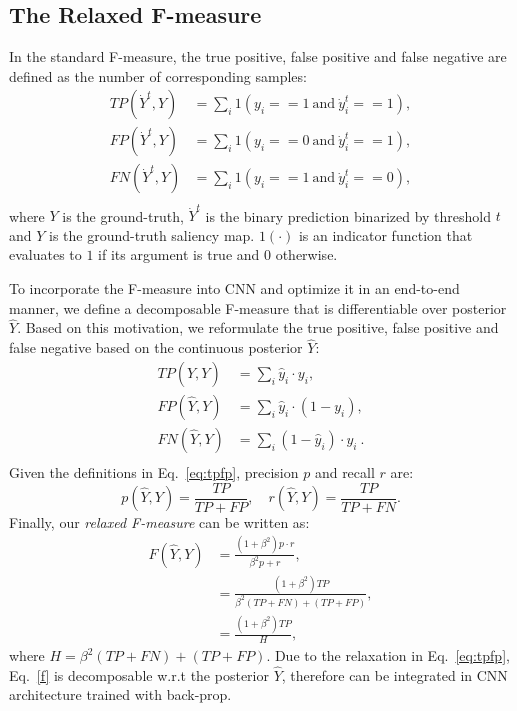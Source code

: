 \documentclass[10pt,twocolumn,letterpaper]{article}
\begin{document}
\subsection{The Relaxed F-measure}
In the standard F-measure, the true positive, 
false positive and false negative are defined as the number of corresponding samples:
\begin{equation}
\begin{split}
TP(\dot{Y}^t, Y) &= \sum\nolimits_i 1(y_i==1 \ \text{and} \ \dot{y}^t_i==1), \\
FP(\dot{Y}^t, Y) &= \sum\nolimits_i 1(y_i==0 \ \text{and} \ \dot{y}^t_i==1), \\
FN(\dot{Y}^t, Y) &= \sum\nolimits_i 1(y_i==1 \ \text{and} \ \dot{y}^t_i==0), \\
\end{split}
\label{eq:tpfp0}
\end{equation}
where $Y$ is the ground-truth, $\dot{Y}^t$ is the binary prediction binarized by threshold $t$
and $Y$ is the ground-truth saliency map.
%
$1(\cdot)$ is an indicator function that evaluates to $1$ if its argument is true and 0 otherwise.

To incorporate the F-measure into CNN and optimize it in an end-to-end manner,
we define a decomposable F-measure that is differentiable over posterior $\hat{Y}$.
%
Based on this motivation, we reformulate the true positive, false positive and false negative
based on the continuous posterior $\hat{Y}$:
\begin{equation}
\begin{split}
TP(\hat{Y}, Y) &= \sum\nolimits_i \hat{y}_i \cdot y_i, \\
FP(\hat{Y}, Y) &= \sum\nolimits_i \hat{y}_i \cdot (1 - y_i), \\
FN(\hat{Y}, Y) &= \sum\nolimits_i (1-\hat{y}_i) \cdot y_i \ . \\
\end{split}
\label{eq:tpfp}
\end{equation}
%
Given the definitions in Eq.~\ref{eq:tpfp}, precision $p$ and recall $r$ are:
\begin{equation}
p(\hat{Y}, Y) = \frac{TP}{TP + FP},\quad r(\hat{Y}, Y) = \frac{TP}{TP + FN}.
\label{pr}
\end{equation}
%
Finally, our \emph{relaxed F-measure} can be written as:
\begin{equation}
\begin{split}
F(\hat{Y}, Y) &= \frac{(1+\beta^2) p \cdot r}{\beta^2 p + r} ,\\
              &= \frac{(1 + \beta^2)TP}{\beta^2(TP + FN) + (TP + FP)} ,\\
              &= \frac{(1 + \beta^2)TP}{H},
\end{split}
\label{f}
\end{equation}
where $H\! =\! \beta^2(TP + FN) + (TP + FP)$.
Due to the relaxation in Eq.~\ref{eq:tpfp}, Eq.~\ref{f} is decomposable w.r.t the
posterior $\hat{Y}$, therefore can be integrated in CNN architecture trained with
back-prop.
\end{document}
